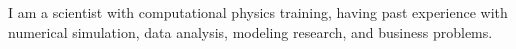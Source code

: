 \documentclass[12pt,a4paper,sans]{moderncv} %
\begin{document}
I am a scientist with computational physics training, having past experience with numerical simulation, data analysis, modeling research, and business problems.
\end{document}
